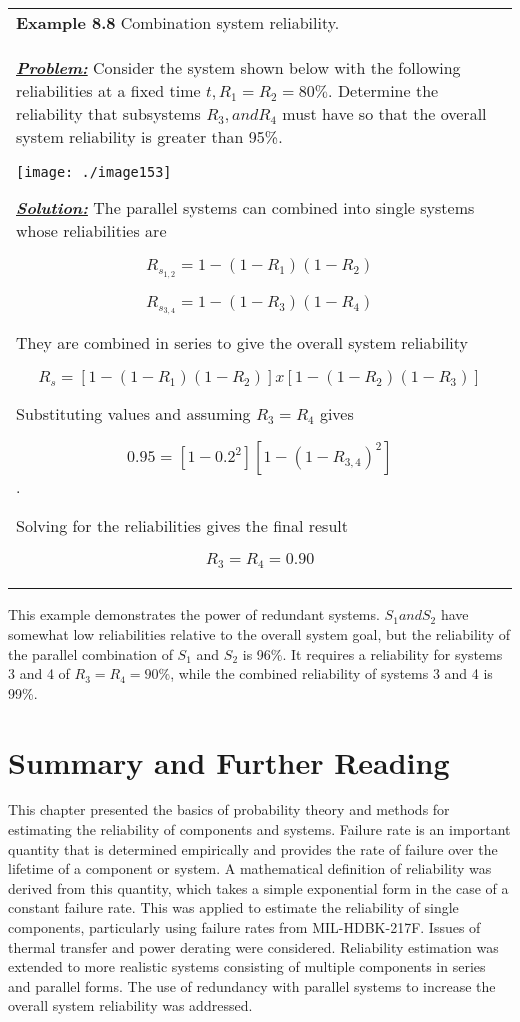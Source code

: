 \begin{table}
\caption{}
\label{table:<context>}
\begin{tabular}{m{15cm}|}
\textbf{Example 8.8} 
Combination system reliability. \\

\emph{\textbf{\ul{Problem:}}} Consider the system shown below with the
following reliabilities at a fixed time $t, R_1=R_2= 80\%$. 
Determine the reliability that subsystems $R_3, and R_4$
must have so that the overall system reliability is greater than 95\%.

\texttt{[image: ./image153]}

\emph{\textbf{\ul{Solution:}}} The parallel systems can combined into
single systems whose reliabilities are

$$R_{s_{1,2}} = 1 - (1-R_1)(1-R_2) $$

$$R_{s_{3,4}} = 1 - (1-R_3)(1-R_4)$$

They are combined in series to give the overall system reliability

$$R_s = \left[ 1 - (1-R_1)(1-R_2) \right] x \left[ 1 - (1-R_2)(1-R_3) \right]$$

Substituting values and assuming $R_3 = R_4$ gives

$$0.95 = \left[ 1-0.2^2 \right] \left[1 - (1-R_{3,4})^2 \right]$$.

Solving for the reliabilities gives the final result

$$R_3 = R_4 = 0.90$$
\end{tabular}
\end{table}

This example demonstrates the power of redundant systems.
$S_1 and S_2$ have somewhat low reliabilities
relative to the overall system goal, but the reliability of the parallel
combination of $S_1$ and $S_2$ is 96\%. It requires a
reliability for systems 3 and 4 of $R_3 = R_4 = 90\%$, while the combined
reliability of systems 3 and 4 is 99\%.

\section{Summary and Further Reading}
\label{section:summary-and-further-reading}

This chapter presented the basics of probability theory and methods for
estimating the reliability of components and systems. Failure rate is an
important quantity that is determined empirically and provides the rate
of failure over the lifetime of a component or system. A mathematical
definition of reliability was derived from this quantity, which takes a
simple exponential form in the case of a constant failure rate. This was
applied to estimate the reliability of single components, particularly
using failure rates from MIL-HDBK-217F. Issues of thermal transfer and
power derating were considered. Reliability estimation was extended to
more realistic systems consisting of multiple components in series and
parallel forms. The use of redundancy with parallel systems to increase
the overall system reliability was addressed.

